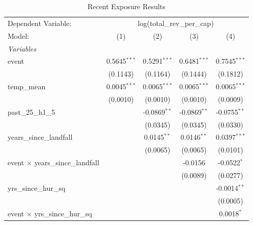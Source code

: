 \documentclass{article}
\begin{document}
\begin{appendices}
\begin{table}[htbp]
   \caption{Recent Exposure Results}
   \centering
   \begin{tabular}{lcccc}
      \tabularnewline \midrule \midrule
      Dependent Variable: & \multicolumn{4}{c}{log(total\_rev\_per\_cap)}\\
      Model:                                   & (1)            & (2)            & (3)            & (4)\\  
      \midrule
      \emph{Variables}\\
      event                                    & 0.5645$^{***}$ & 0.5291$^{***}$ & 0.6481$^{***}$ & 0.7545$^{***}$\\   
                                               & (0.1143)       & (0.1164)       & (0.1444)       & (0.1812)\\   
      temp\_mean                               & 0.0045$^{***}$ & 0.0065$^{***}$ & 0.0065$^{***}$ & 0.0065$^{***}$\\   
                                               & (0.0010)       & (0.0010)       & (0.0010)       & (0.0009)\\   
      past\_25\_h1\_5                          &                & -0.0869$^{**}$ & -0.0869$^{**}$ & -0.0755$^{**}$\\   
                                               &                & (0.0345)       & (0.0345)       & (0.0330)\\   
      years\_since\_landfall                   &                & 0.0145$^{**}$  & 0.0146$^{**}$  & 0.0397$^{***}$\\   
                                               &                & (0.0065)       & (0.0065)       & (0.0101)\\   
      event $\times$ years\_since\_landfall    &                &                & -0.0156        & -0.0522$^{*}$\\   
                                               &                &                & (0.0089)       & (0.0277)\\   
      yrs\_since\_hur\_sq                      &                &                &                & -0.0014$^{**}$\\   
                                               &                &                &                & (0.0005)\\   
      event $\times$ yrs\_since\_hur\_sq       &                &                &                & 0.0018$^{*}$\\   

\end{tabular}
\end{table}
\end{appendices}
\end{document}
